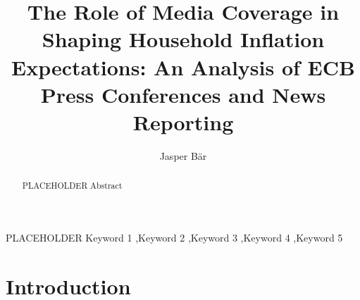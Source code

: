 \documentclass[review]{elsarticle}
\begin{document}
\begin{frontmatter}

\title{The Role of Media Coverage in Shaping Household Inflation Expectations: An Analysis of ECB Press Conferences and News Reporting}

\author {Jasper Bär}


\begin{abstract}
PLACEHOLDER Abstract
\end{abstract}

\begin{keyword}
PLACEHOLDER Keyword 1 \sep Keyword 2 \sep Keyword 3 \sep Keyword 4 \sep Keyword 5
\end{keyword}


\end{frontmatter}

\newpage

\section{Introduction} \label{sec:intro}

\end{document}
